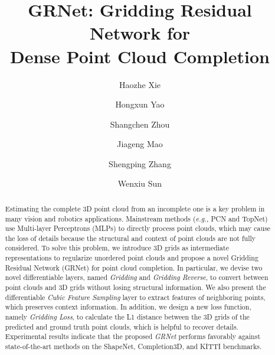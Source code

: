 \documentclass[runningheads]{llncs}
\begin{document}
\DeclarePairedDelimiter\ceil{\lceil}{\rceil}
\DeclarePairedDelimiter\floor{\lfloor}{\rfloor}
\pagestyle{headings}
\mainmatter
\def\ECCVSubNumber{798}
\title{GRNet: Gridding Residual Network for \\Dense Point Cloud Completion}

\author{
Haozhe Xie  \and
Hongxun Yao  \and
Shangchen Zhou  \and
Jiageng Mao  \and
Shengping Zhang  \and
Wenxiu Sun }






\maketitle

\begin{abstract}
Estimating the complete 3D point cloud from an incomplete one is a key problem in many vision and robotics applications.
Mainstream methods ({\it e.g.,} PCN and TopNet) use Multi-layer Perceptrons (MLPs) to directly process point clouds, which may cause the loss of details because the structural and context of point clouds are not fully considered.
To solve this problem, we introduce 3D grids as intermediate representations to regularize unordered point clouds and propose a novel Gridding Residual Network (GRNet) for point cloud completion.
In particular, we devise two novel differentiable layers, named {\it Gridding} and {\it Gridding Reverse}, to convert between point clouds and 3D grids without losing structural information.
We also present the differentiable {\it Cubic Feature Sampling} layer to extract features of neighboring points, which preserves context information.
In addition, we design a new loss function, namely {\it Gridding Loss}, to calculate the L1 distance between the 3D grids of the predicted and ground truth point clouds, which is helpful to recover details.
Experimental results indicate that the proposed {\it GRNet} performs favorably against state-of-the-art methods on the ShapeNet, Completion3D, and KITTI benchmarks.

\end{abstract}
\end{document}
